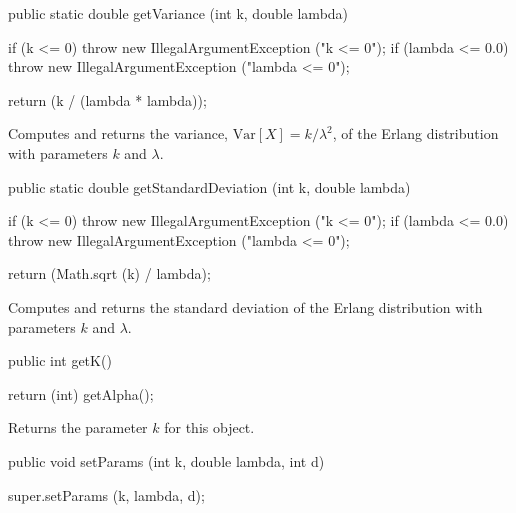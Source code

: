 \begin{htmlonly}
\end{htmlonly}
\begin{code}

   public static double getVariance (int k, double lambda)\begin{hide} {
      if (k <= 0)
         throw new IllegalArgumentException ("k <= 0");
      if (lambda <= 0.0)
         throw new IllegalArgumentException ("lambda <= 0");

      return (k / (lambda * lambda));
   }\end{hide}
\end{code}
\begin{tabb}  Computes and returns the variance, $\mbox{Var}[X] = k/\lambda^2$,
   of the Erlang distribution with parameters $k$ and $\lambda$.
\end{tabb}
\begin{htmlonly}
\end{htmlonly}
\begin{code}

   public static double getStandardDeviation (int k, double lambda)\begin{hide} {
      if (k <= 0)
         throw new IllegalArgumentException ("k <= 0");
      if (lambda <= 0.0)
         throw new IllegalArgumentException ("lambda <= 0");

      return (Math.sqrt (k) / lambda);
   }\end{hide}
\end{code}
\begin{tabb}  Computes and returns the standard deviation of the Erlang
   distribution with parameters $k$ and $\lambda$.
\end{tabb}
\begin{htmlonly}
\end{htmlonly}
\begin{code}

   public int getK()\begin{hide} {
      return (int) getAlpha();
   }\end{hide}
\end{code}
  \begin{tabb} Returns the parameter $k$ for this object.
  \end{tabb}
\begin{code}

   public void setParams (int k, double lambda, int d)\begin{hide} {
      super.setParams (k, lambda, d);
   }\end{hide}
\end{code}
